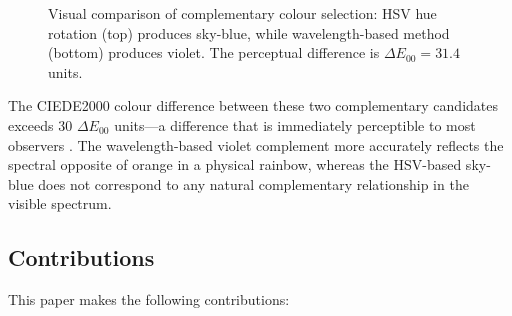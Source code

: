 \documentclass[12pt,a4paper]{article}
\newcommand{\deltaE}{\Delta E_{00}}
\begin{document}
\begin{figure}[H]
\centering
{}
\caption{Visual comparison of complementary colour selection: HSV hue rotation (top) produces sky-blue, while wavelength-based method (bottom) produces violet. The perceptual difference is $\deltaE = 31.4$ units.}
\label{fig:complement-comparison}
\end{figure}

The CIEDE2000 colour difference between these two complementary candidates exceeds 30 $\deltaE$ units—a difference that is immediately perceptible to most observers \cite{sharma2005ciede2000}. The wavelength-based violet complement more accurately reflects the spectral opposite of orange in a physical rainbow, whereas the HSV-based sky-blue does not correspond to any natural complementary relationship in the visible spectrum.

\subsection{Contributions}

This paper makes the following contributions:
\end{document}
